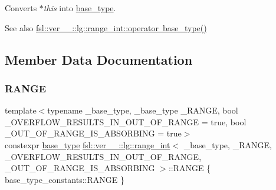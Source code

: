 Converts {\itshape $\ast$this} into \mbox{\hyperlink{classfsl_1_1ver__1__0_1_1lg_1_1range__int_aa6c763f6d72d18c8b9129c0c06628cd3}{base\+\_\+type}}. 

\begin{DoxySeeAlso}{See also}
\mbox{\hyperlink{classfsl_1_1ver__1__0_1_1lg_1_1range__int_a0b4a2f845550553abc83cbe4c6203403}{fsl\+::ver\+\_\+\_\+::lg\+::range\+\_\+int\+::operator base\+\_\+type()}} 
\end{DoxySeeAlso}


\subsection{Member Data Documentation}
\mbox{\label{classfsl_1_1ver__1__0_1_1lg_1_1range__int_ae1914aaa2b3bdfc26a9dfd71c73efffd}} 
\subsubsection{\texorpdfstring{RANGE}{RANGE}}
{\footnotesize\ttfamily template$<$typename \+\_\+base\+\_\+type, \+\_\+base\+\_\+type \+\_\+\+R\+A\+N\+GE, bool \+\_\+\+O\+V\+E\+R\+F\+L\+O\+W\+\_\+\+R\+E\+S\+U\+L\+T\+S\+\_\+\+I\+N\+\_\+\+O\+U\+T\+\_\+\+O\+F\+\_\+\+R\+A\+N\+GE = true, bool \+\_\+\+O\+U\+T\+\_\+\+O\+F\+\_\+\+R\+A\+N\+G\+E\+\_\+\+I\+S\+\_\+\+A\+B\+S\+O\+R\+B\+I\+NG = true$>$ \\
constexpr \mbox{\hyperlink{classfsl_1_1ver__1__0_1_1lg_1_1range__int_aa6c763f6d72d18c8b9129c0c06628cd3}{base\+\_\+type}} \mbox{\hyperlink{classfsl_1_1ver__1__0_1_1lg_1_1range__int}{fsl\+::ver\+\_\+\_\+::lg\+::range\+\_\+int}}$<$ \+\_\+base\+\_\+type, \+\_\+\+R\+A\+N\+GE, \+\_\+\+O\+V\+E\+R\+F\+L\+O\+W\+\_\+\+R\+E\+S\+U\+L\+T\+S\+\_\+\+I\+N\+\_\+\+O\+U\+T\+\_\+\+O\+F\+\_\+\+R\+A\+N\+GE, \+\_\+\+O\+U\+T\+\_\+\+O\+F\+\_\+\+R\+A\+N\+G\+E\+\_\+\+I\+S\+\_\+\+A\+B\+S\+O\+R\+B\+I\+NG $>$\+::R\+A\+N\+GE \{ base\+\_\+type\+\_\+constants\+::\+R\+A\+N\+GE \}\hspace{0.3cm}{\ttfamily [static]}}



